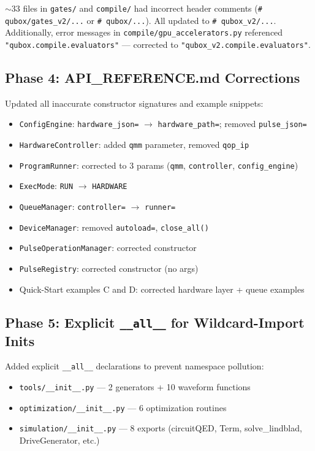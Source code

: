 \documentclass[11pt]{article}
\begin{document}
$\sim$33 files in \texttt{gates/} and \texttt{compile/} had incorrect header
comments (\texttt{\# qubox/gates\_v2/...} or \texttt{\# qubox/...}).
All updated to \texttt{\# qubox\_v2/...}.
Additionally, error messages in \texttt{compile/gpu\_accelerators.py} referenced
\texttt{"qubox.compile.evaluators"} --- corrected to
\texttt{"qubox\_v2.compile.evaluators"}.

\subsection{Phase 4: API\_REFERENCE.md Corrections}

Updated all inaccurate constructor signatures and example snippets:

\begin{itemize}
  \item \texttt{ConfigEngine}: \texttt{hardware\_json=} $\rightarrow$ \texttt{hardware\_path=}; removed \texttt{pulse\_json=}
  \item \texttt{HardwareController}: added \texttt{qmm} parameter, removed \texttt{qop\_ip}
  \item \texttt{ProgramRunner}: corrected to 3 params (\texttt{qmm}, \texttt{controller}, \texttt{config\_engine})
  \item \texttt{ExecMode}: \texttt{RUN} $\rightarrow$ \texttt{HARDWARE}
  \item \texttt{QueueManager}: \texttt{controller=} $\rightarrow$ \texttt{runner=}
  \item \texttt{DeviceManager}: removed \texttt{autoload=}, \texttt{close\_all()}
  \item \texttt{PulseOperationManager}: corrected constructor
  \item \texttt{PulseRegistry}: corrected constructor (no args)
  \item Quick-Start examples C and D: corrected hardware layer + queue examples
\end{itemize}

\subsection{Phase 5: Explicit \texttt{\_\_all\_\_} for Wildcard-Import Inits}

Added explicit \texttt{\_\_all\_\_} declarations to prevent namespace pollution:

\begin{itemize}
  \item \texttt{tools/\_\_init\_\_.py} --- 2 generators + 10 waveform functions
  \item \texttt{optimization/\_\_init\_\_.py} --- 6 optimization routines
  \item \texttt{simulation/\_\_init\_\_.py} --- 8 exports (circuitQED, Term,
        solve\_lindblad, DriveGenerator, etc.)
\end{itemize}
\end{document}
